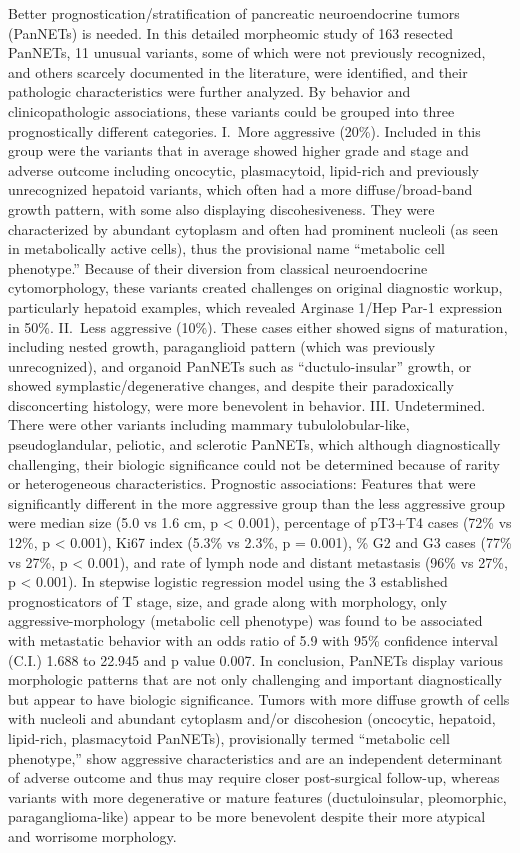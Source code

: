 \documentclass[
]{article}
\begin{document}
Better prognostication/stratification of pancreatic neuroendocrine
tumors (PanNETs) is needed. In this detailed morpheomic study of 163
resected PanNETs, 11 unusual variants, some of which were not previously
recognized, and others scarcely documented in the literature, were
identified, and their pathologic characteristics were further analyzed.
By behavior and clinicopathologic associations, these variants could be
grouped into three prognostically different categories. I.~More
aggressive (20\%). Included in this group were the variants that in
average showed higher grade and stage and adverse outcome including
oncocytic, plasmacytoid, lipid-rich and previously unrecognized hepatoid
variants, which often had a more diffuse/broad-band growth pattern, with
some also displaying discohesiveness. They were characterized by
abundant cytoplasm and often had prominent nucleoli (as seen in
metabolically active cells), thus the provisional name ``metabolic cell
phenotype.'' Because of their diversion from classical neuroendocrine
cytomorphology, these variants created challenges on original diagnostic
workup, particularly hepatoid examples, which revealed Arginase 1/Hep
Par-1 expression in 50\%. II.~Less aggressive (10\%). These cases either
showed signs of maturation, including nested growth, paraganglioid
pattern (which was previously unrecognized), and organoid PanNETs such
as ``ductulo-insular'' growth, or showed symplastic/degenerative
changes, and despite their paradoxically disconcerting histology, were
more benevolent in behavior. III. Undetermined. There were other
variants including mammary tubulolobular-like, pseudoglandular,
peliotic, and sclerotic PanNETs, which although diagnostically
challenging, their biologic significance could not be determined because
of rarity or heterogeneous characteristics. Prognostic associations:
Features that were significantly different in the more aggressive group
than the less aggressive group were median size (5.0 vs 1.6 cm, p
\textless{} 0.001), percentage of pT3+T4 cases (72\% vs 12\%, p
\textless{} 0.001), Ki67 index (5.3\% vs 2.3\%, p = 0.001), \% G2 and G3
cases (77\% vs 27\%, p \textless{} 0.001), and rate of lymph node and
distant metastasis (96\% vs 27\%, p \textless{} 0.001). In stepwise
logistic regression model using the 3 established prognosticators of T
stage, size, and grade along with morphology, only aggressive-morphology
(metabolic cell phenotype) was found to be associated with metastatic
behavior with an odds ratio of 5.9 with 95\% confidence interval (C.I.)
1.688 to 22.945 and p value 0.007. In conclusion, PanNETs display
various morphologic patterns that are not only challenging and important
diagnostically but appear to have biologic significance. Tumors with
more diffuse growth of cells with nucleoli and abundant cytoplasm and/or
discohesion (oncocytic, hepatoid, lipid-rich, plasmacytoid PanNETs),
provisionally termed ``metabolic cell phenotype,'' show aggressive
characteristics and are an independent determinant of adverse outcome
and thus may require closer post-surgical follow-up, whereas variants
with more degenerative or mature features (ductuloinsular, pleomorphic,
paraganglioma-like) appear to be more benevolent despite their more
atypical and worrisome morphology.
\end{document}

